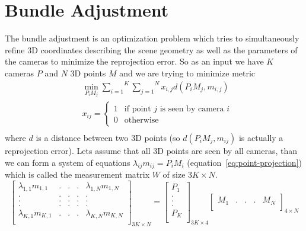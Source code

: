 \section{Bundle Adjustment}
\label{sec:bundle-adjustment}
The bundle adjustment is an optimization problem which tries to simultaneously refine 3D coordinates describing the scene geometry as well as the parameters of the cameras to minimize the reprojection error. So as an input we have $K$ cameras $P$ and $N$ 3D points $M$ and we are trying to minimize metric
\begin{equation}
  \begin{aligned}
	&\underset{P_i M_j}{\min} \overset{K}{\underset{i=1}{\sum}} \overset{N}{\underset{j=1}{\sum}} x_{i,j} d(P_i M_j ,m_{i,j}) \\
	& x_{ij} = 
	\begin{cases}
		1 & \text{if point } j \text{ is seen by camera } i \\
		0 & \text{otherwise}
	\end{cases} \\
	\end{aligned}
	\label{eq:bundle-adjustment}
\end{equation}
where $d$ is a distance between two 3D points (so $d(P_i M_j ,m_{ij})$ is actually a reprojection error). Lets assume that all 3D points are seen by all cameras, than we can form a system of equations $\lambda_{ij} m_{ij} = P_i M_i$ (equation~\ref{eq:point-projection}) which is called the measurement matrix $W$ of size $3K \times N$.
\begin{equation}
	\begin{bmatrix}
		\lambda_{1,1} m_{1,1} & . & . & . & \lambda_{1,N} m_{1,N} \\
		. & . & . & . &. \\
		. & . & . & . &. \\
		. & . & . & . &. \\
		\lambda_{K,1} m_{K,1} & . & . & . & \lambda_{K,N} m_{K,N} \\
	\end{bmatrix}_{3K \times N}
	= 
	\begin{bmatrix}
		P_{1} \\
		. \\
		. \\
		. \\
		P_{K} \\
	\end{bmatrix}_{3K \times 4}
	\begin{bmatrix}
		M_{1} & . & . & . & M_{N} \\
	\end{bmatrix}_{4 \times N}
\end{equation}
